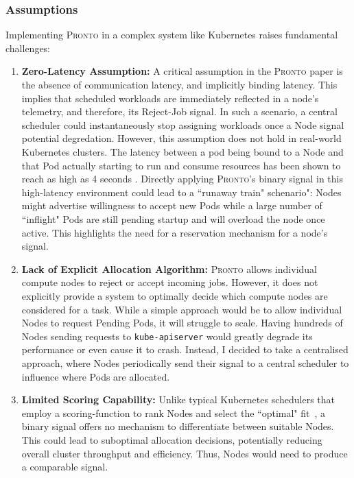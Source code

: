 \subsubsection{Assumptions}
Implementing \textsc{Pronto} in a complex system like Kubernetes raises
fundamental challenges:
\begin{enumerate}
    \item \textbf{Zero-Latency Assumption:} A critical assumption in the
        \textsc{Pronto} paper is the absence of communication latency, and
        implicitly binding latency. This implies that scheduled workloads are
        immediately reflected in a node's telemetry, and therefore, its
        Reject-Job signal. In such a scenario, a central scheduler could
        instantaneously stop assigning workloads once a Node signal potential
        degredation. However, this assumption does not hold in real-world
        Kubernetes clusters. The latency between a pod being bound to a Node and
        that Pod actually starting to run and consume resources has been shown
        to reach as high as 4 seconds \cite{qadeer_scaling_2022}. Directly
        applying \textsc{Pronto}'s binary signal in this high-latency
        environment could lead to a ``runaway train" schenario": Nodes might
        advertise willingness to accept new Pods while a large number of
        ``inflight" Pods are still pending startup and will overload the node
        once active. This highlights the need for a reservation mechanism for
        a node's signal.
    \item \textbf{Lack of Explicit Allocation Algorithm:} \textsc{Pronto} allows
        individual compute nodes to reject or accept incoming jobs. However, it
        does not explicitly provide a system to optimally decide which compute
        nodes are considered for a task. While a simple approach would be to allow
        individual Nodes to request Pending Pods, it will struggle to scale.
        Having hundreds of Nodes sending requests to \texttt{kube-apiserver}
        would greatly degrade its performance or even cause it to crash.
        Instead, I decided to take a centralised approach, where Nodes
        periodically send their signal to a central scheduler to influence where
        Pods are allocated.
    \item \textbf{Limited Scoring Capability:} Unlike typical Kubernetes
        schedulers that employ a scoring-function to rank Nodes and select the
        ``optimal" fit~\cite{kube-scheduler}, a binary signal offers no
        mechanism to differentiate between suitable Nodes. This could lead to
        suboptimal allocation decisions, potentially reducing overall cluster
        throughput and efficiency. Thus, Nodes would need to produce a
        comparable signal.
\end{enumerate}

